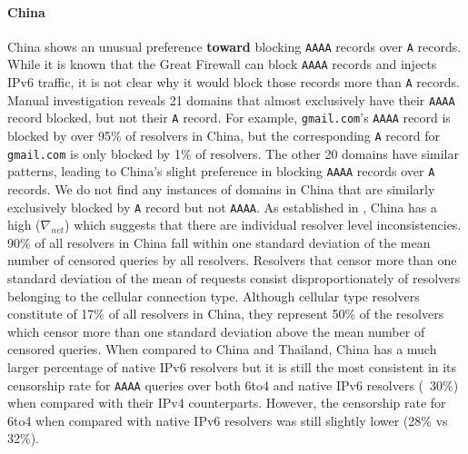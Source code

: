 \paragraph{China}
China shows an unusual preference \textbf{toward} blocking \texttt{AAAA}
records over \texttt{A} records. While it is known that the Great Firewall
can block \texttt{AAAA} records and injects IPv6 traffic, it is not clear why it
would block those records more than \texttt{A} records. Manual investigation reveals
21 domains that almost exclusively have their \texttt{AAAA} record blocked, but
not their \texttt{A} record. For example, \texttt{gmail.com}'s \texttt{AAAA}
record is blocked by over 95\% of resolvers in China, but the corresponding
\texttt{A} record for \texttt{gmail.com} is only blocked by 1\% of resolvers.
The other 20 domains have similar patterns, leading to China's slight preference
in blocking \texttt{AAAA} records over \texttt{A} records. We do not find any
instances of domains in China that are similarly exclusively blocked by
\texttt{A} record but not \texttt{AAAA}. As established in 
,
China has a high ($\nabla_{net}$) which suggests that there are individual resolver
level inconsistencies. 90\% of all resolvers in China fall within one standard deviation
of the mean number of censored queries by all resolvers. Resolvers that censor
more than one standard deviation of the mean of requests consist disproportionately
of resolvers belonging to the cellular connection type. Although cellular type resolvers
constitute of 17\% of all resolvers in China, they represent 50\% of the resolvers which
censor more than one standard deviation above the mean number of censored queries. 
When compared to China and Thailand, China has a much larger percentage of native
IPv6 resolvers but it is still the most consistent in its censorship rate for \texttt{AAAA}
queries over both 6to4 and native IPv6 resolvers (~30\%) when compared with their IPv4
counterparts. However, the censorship rate for 6to4 when compared with native IPv6 resolvers
was still slightly lower (28\% vs 32\%).





